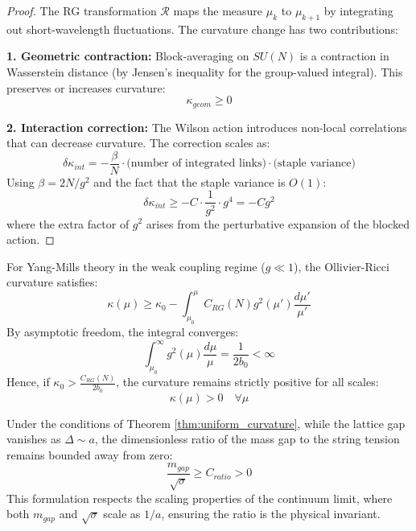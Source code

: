 \begin{proof}
The RG transformation $\mathcal{R}$ maps the measure $\mu_k$ to $\mu_{k+1}$ by integrating out short-wavelength fluctuations. The curvature change has two contributions:

\textbf{1. Geometric contraction:}
Block-averaging on $SU(N)$ is a contraction in Wasserstein distance (by Jensen's inequality for the group-valued integral). This preserves or increases curvature:
\begin{equation}
    \kappa_{geom} \geq 0
\end{equation}

\textbf{2. Interaction correction:}
The Wilson action introduces non-local correlations that can decrease curvature. The correction scales as:
\begin{equation}
    \delta\kappa_{int} = -\frac{\beta}{N} \cdot \text{(number of integrated links)} \cdot \text{(staple variance)}
\end{equation}
Using $\beta = 2N/g^2$ and the fact that the staple variance is $O(1)$:
\begin{equation}
    \delta\kappa_{int} \geq -C \cdot \frac{1}{g^2} \cdot g^4 = -C g^2
\end{equation}
where the extra factor of $g^2$ arises from the perturbative expansion of the blocked action.
\end{proof}

\begin{theorem}\label{thm:uniform_curvature}
For Yang-Mills theory in the weak coupling regime ($g \ll 1$), the Ollivier-Ricci curvature satisfies:
\begin{equation}
    \kappa(\mu) \geq \kappa_0 - \int_{\mu_0}^{\mu} C_{RG}(N) g^2(\mu') \frac{d\mu'}{\mu'}
\end{equation}
By asymptotic freedom, the integral converges:
\begin{equation}
    \int_{\mu_0}^{\infty} g^2(\mu) \frac{d\mu}{\mu} = \frac{1}{2b_0} < \infty
\end{equation}
Hence, if $\kappa_0 > \frac{C_{RG}(N)}{2 b_0}$, the curvature remains strictly positive for all scales:
\begin{equation}
    \kappa(\mu) > 0 \quad \forall \mu
\end{equation}
\end{theorem}

\begin{corollary}\label{cor:continuum_gap}
Under the conditions of Theorem \ref{thm:uniform_curvature}, while the lattice gap vanishes as $\Delta \sim a$, the dimensionless ratio of the mass gap to the string tension remains bounded away from zero:
\begin{equation}
    \frac{m_{gap}}{\sqrt{\sigma}} \geq C_{ratio} > 0
\end{equation}
This formulation respects the scaling properties of the continuum limit, where both $m_{gap}$ and $\sqrt{\sigma}$ scale as $1/a$, ensuring the ratio is the physical invariant.
\end{corollary}

